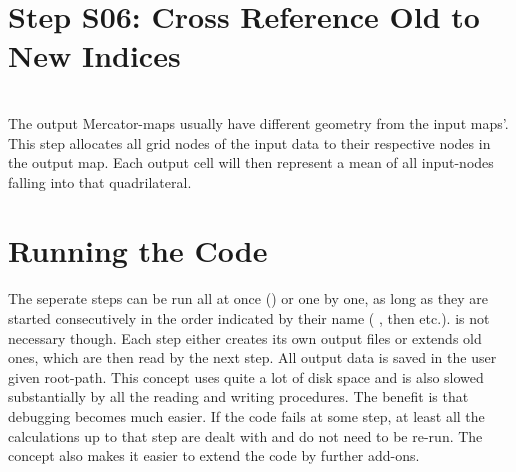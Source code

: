 \section{Step S06: Cross Reference Old to New Indices} \label{S:06}
\\
The output Mercator-maps usually have different geometry from the input maps'.
This step allocates all grid nodes of the input data
to their respective nodes in the output map. Each output cell will then represent a mean of all input-nodes falling into that quadrilateral.



\section{Running the Code}
The seperate steps can be run all at once () or one by one, as
long as they are started consecutively in the order indicated by their name
( , then  etc.).  is not necessary
though. Each step either creates its own output files or extends old ones,  which are then read by the next step.
All output data is saved in the user given root-path.
This concept uses quite a lot of disk space and is also slowed substantially by all the reading and writing procedures. The benefit is that debugging becomes much easier. If the code fails at some step,
at least all the calculations up to that step are dealt with and do not need to
be re-run. The concept also makes it easier to extend the code by further
add-ons.
